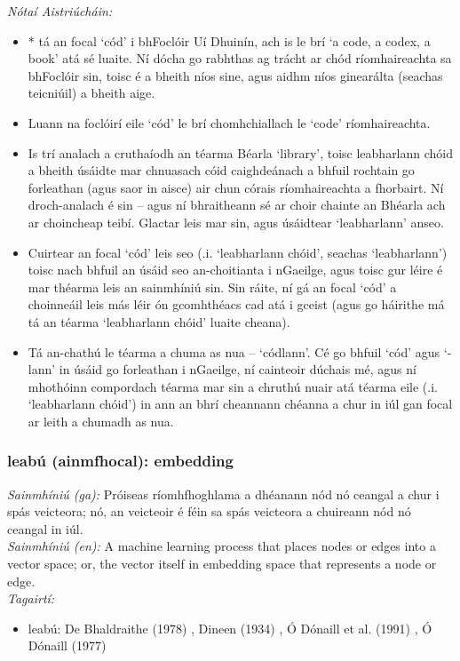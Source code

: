  \noindent \textit{Nótaí Aistriúcháin:}
\begin{itemize}
	\item * tá an focal `cód' i bhFoclóir Uí Dhuinín, ach is le brí `a code, a codex, a book' atá sé luaite. Ní dócha go rabhthas ag trácht ar chód ríomhaireachta sa bhFoclóir sin, toisc é a bheith níos sine, agus aidhm níos ginearálta (seachas teicniúil) a bheith aige.
	\item Luann na foclóirí eile `cód' le brí chomhchiallach le `code' ríomhaireachta.
	\item Is trí analach a cruthaíodh an téarma Béarla `library', toisc leabharlann chóid a bheith úsáidte mar chnuasach cóid caighdeánach a bhfuil rochtain go forleathan (agus saor in aisce) air chun córais ríomhaireachta a fhorbairt. Ní droch-analach é sin -- agus ní bhraitheann sé ar choir chainte an Bhéarla ach ar choincheap teibí. Glactar leis mar sin, agus úsáidtear `leabharlann' anseo.
	\item Cuirtear an focal `cód' leis seo (.i. `leabharlann chóid', seachas `leabharlann') toisc nach bhfuil an úsáid seo an-choitianta i nGaeilge, agus toisc gur léire é mar théarma leis an sainmhíniú sin. Sin ráite, ní gá an focal `cód' a choinneáil leis más léir ón gcomhthéacs cad atá i gceist (agus go háirithe má tá an téarma `leabharlann chóid' luaite cheana).
	\item Tá an-chathú le téarma a chuma as nua -- `códlann'. Cé go bhfuil `cód' agus `-lann' in úsáid go forleathan i nGaeilge, ní cainteoir dúchais mé, agus ní mhothóinn compordach téarma mar sin a chruthú nuair atá téarma eile (.i. `leabharlann chóid') in ann an bhrí cheannann chéanna a chur in iúl gan focal ar leith a chumadh as nua.
\end{itemize}


\subsubsection*{leabú (ainmfhocal): embedding}
 \noindent \textit{Sainmhíniú (ga):} Próiseas ríomhfhoghlama a dhéanann nód nó ceangal a chur i spás veicteora; nó, an veicteoir é féin sa spás veicteora a chuireann nód nó ceangal in iúl.
\\
 \noindent \textit{Sainmhíniú (en):} A machine learning process that places nodes or edges into a vector space; or, the vector itself in embedding space that represents a node or edge.
\\
 \noindent \textit{Tagairtí:}
\begin{itemize}
	\item leabú: De Bhaldraithe (1978) \cite{de-bhaldraithe}, Dineen (1934) \cite{dineen}, Ó Dónaill et al. (1991) \cite{focloir-beag}, Ó Dónaill (1977) \cite{odonaill}
\end{itemize}

